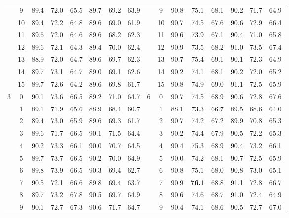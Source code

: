 \begin{table}[p]
{\begin{tabular}{c c | c c c | c c c || c c | c c c | c c c}
             & 9 & 89.4 & 72.0 & 65.5 & 89.7 & 69.2 & 63.9 &  & 9 & 90.8 & 75.1 & 68.1 & 90.2 & 71.7 & 64.9 \\
             & 10 & 89.4 & 72.2 & 64.8 & 89.6 & 69.0 & 61.9 &  & 10 & 90.7 & 74.5 & 67.6 & 90.6 & 72.9 & 66.4 \\
             & 11 & 89.6 & 72.0 & 64.6 & 89.6 & 68.2 & 62.3 &  & 11 & 90.6 & 73.9 & 67.1 & 90.4 & 71.0 & 65.8 \\
             & 12 & 89.6 & 72.1 & 64.3 & 89.4 & 70.0 & 62.4 &  & 12 & 90.9 & 73.5 & 68.2 & 91.0 & 73.5 & 67.4 \\
             & 13 & 88.9 & 72.0 & 64.7 & 89.6 & 69.7 & 62.3 &  & 13 & 90.7 & 75.4 & 69.1 & 90.1 & 72.3 & 64.9 \\
             & 14 & 89.7 & 73.1 & 64.7 & 89.0 & 69.1 & 62.6 &  & 14 & 90.2 & 74.1 & 68.1 & 90.2 & 72.0 & 65.2 \\
             & 15 & 89.7 & 72.6 & 64.2 & 89.6 & 69.8 & 61.7 &  & 15 & 90.8 & 74.9 & 69.0 & 91.1 & 72.5 & 65.9 \\
            \midrule
            \multirow{16}{*}{3} & 0 & 90.1 & 73.6 & 66.5 & 89.2 & 71.0 & 64.7 & \multirow{16}{*}{6} & 0 & 90.7 & 74.5 & 68.9 & 90.6 & 72.8 & 67.6 \\
             & 1 & 89.1 & 71.9 & 65.6 & 88.9 & 68.4 & 60.7 &  & 1 & 88.1 & 73.3 & 66.7 & 89.5 & 68.6 & 64.0 \\
             & 2 & 89.4 & 73.0 & 65.9 & 89.6 & 69.3 & 61.7 &  & 2 & 90.7 & 74.2 & 67.2 & 89.9 & 70.8 & 65.3 \\
             & 3 & 89.6 & 71.7 & 66.5 & 90.1 & 71.5 & 64.4 &  & 3 & 90.2 & 74.4 & 67.9 & 90.5 & 72.2 & 65.3 \\
             & 4 & 90.2 & 73.3 & 66.1 & 90.0 & 70.7 & 64.5 &  & 4 & 90.4 & 75.3 & 68.9 & 90.4 & 73.2 & 66.1 \\
             & 5 & 89.7 & 73.7 & 66.5 & 90.2 & 70.0 & 64.9 &  & 5 & 90.0 & 74.2 & 68.1 & 90.7 & 72.5 & 65.9 \\
             & 6 & 89.8 & 73.9 & 66.5 & 90.3 & 69.4 & 62.7 &  & 6 & 90.8 & 75.1 & 68.0 & 90.8 & 73.0 & 65.1 \\
             & 7 & 90.5 & 72.1 & 66.6 & 89.8 & 69.4 & 63.7 &  & 7 & 90.9 & \textbf{76.1} & 68.8 & 91.1 & 72.8 & 66.7 \\
             & 8 & 89.7 & 73.2 & 67.8 & 90.5 & 69.7 & 64.9 &  & 8 & 90.6 & 74.6 & 68.7 & 91.0 & 72.4 & 64.9 \\
             & 9 & 90.1 & 72.7 & 67.3 & 90.6 & 71.7 & 64.7 &  & 9 & 90.4 & 74.1 & 68.6 & 90.5 & 72.7 & 67.0 \\

\end{tabular}}
\end{table}
